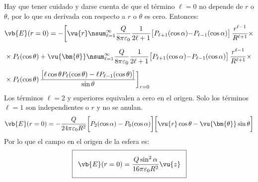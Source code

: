 \begin{enumerate}
Hay que tener cuidado y darse cuenta de que el término $\ell = 0$ no depende de $r$ o $\theta$, por lo que su derivada con respecto a $r$ o $\theta$ es cero. Entonces:
\begin{align*}
&\vb{E} (r = 0) = - \bigg[  \vu{r} \nsum_{\ell=1}^{\infty} \dfrac{Q}{8 \pi \varepsilon_{0}} \dfrac{1}{2 \ell + 1} \big[ P_{\ell+1} (\cos \alpha) {-} P_{\ell-1} (\cos \alpha) \big] \, \dfrac{r^{\ell-1}}{R^{\ell+1}} \times \\[0.5em]
&\times  P_{\ell} (\cos \theta) + \vu{\bm{\theta}} \nsum_{\ell=1}^{\infty} \dfrac{Q}{8 \pi \varepsilon_{0}} \dfrac{1}{2 \ell + 1} \big[ P_{\ell+1} (\cos \alpha) {-} P_{\ell-1} (\cos \alpha) \big] \, \dfrac{r^{\ell-1}}{R^{\ell+1}} \times \\[0.5em]
&\times P_{\ell} (\cos \theta) \, \dfrac{\big[ \ell \cos \theta P_{\ell} (\cos \theta) - \ell P_{\ell-1} (\cos \theta) \big]}{\sin \theta} \bigg]_{r=0}
\end{align*}
Los términos $\ell = 2$ y superiores equivalen a cero en el origen. Solo los términos $\ell = 1$ son independientes o $r$ y no se anulan.
\begin{align*}
\vb{E} (r = 0) = - \dfrac{Q}{24 \pi \varepsilon_{0} R^{2}} \bigg[ P_{2} (\cos \alpha) -P_{0} (\cos \alpha) \bigg] \bigg[ \vu{r} \cos \theta - \vu{\bm{\theta}} \sin \theta \bigg]
\end{align*}
Por lo que el campo en el origen de la esfera es:
\begin{align*}
\addtolength{\fboxsep}{5pt}\boxed{
\vb{E} (r = 0) = \dfrac{Q \sin^{2}\alpha}{16 \pi \varepsilon_{0} R^{2}} \vu{z} }
\end{align*}
\end{enumerate}

